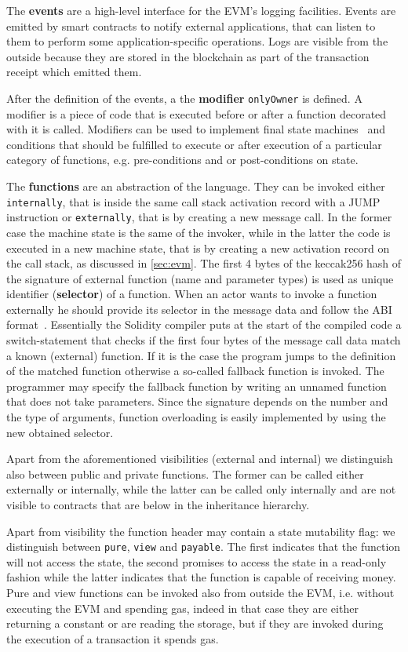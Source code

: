 The \textbf{events} are a high-level interface for the EVM's logging 
facilities. Events are emitted by smart contracts to notify external 
applications, that can listen to them to perform some application-specific
operations. Logs are visible from the outside because they are stored
in the blockchain as part of the transaction receipt which emitted them.

After the definition of the events, a the \textbf{modifier} \verb|onlyOwner| is
defined. A modifier is a piece of code that is executed before or after a 
function decorated with it is called. Modifiers can be used to implement final
state machines~\cite{bib:solidity-docs} and conditions that should be fulfilled 
to execute or after execution of a particular category of functions, e.g. 
pre-conditions and or post-conditions on state.

The \textbf{functions} are an abstraction of the language. They can be invoked 
either  \texttt{internally}, that is inside the same call stack activation 
record with a JUMP instruction or \texttt{externally}, that is by creating a
new message  call. In the former case the machine state is the same of the
invoker, while in the latter the code is executed in a new machine state, that is by creating a new activation record on the call stack, as discussed in
\autoref{sec:evm}.
The first 4 bytes of the keccak256 hash of the signature of external function
(name and parameter types) is used as unique identifier (\textbf{selector}) of
a function. When an actor wants to invoke a function externally he should 
provide its selector in the message data and follow the ABI
format~\cite{bib:solidity-docs}.
Essentially the Solidity compiler puts at the start of the compiled code a
switch-statement that checks if the first four bytes of the message call data
match a known (external) function. If it is the case the program jumps to the
definition of the matched function otherwise a so-called fallback function is 
invoked.
The programmer may specify the fallback function by writing an unnamed function
that does not take parameters. Since the signature depends on the number and
the type of arguments, function overloading is easily implemented by using
the new obtained selector.

Apart from the aforementioned visibilities (external and internal)
we distinguish also between public and private functions. The former can be
called either externally or internally, while the latter can be called only 
internally and are not visible to contracts that are below in the inheritance
hierarchy.

Apart from visibility the function header may contain a state mutability flag:
we distinguish between \texttt{pure}, \texttt{view} and \texttt{payable}. 
The first indicates that the function will not access the state, the second
promises to access the state in a read-only fashion while the latter indicates 
that the function is capable of receiving money.
Pure and view functions can be invoked also from outside the EVM, i.e. without
executing the EVM and spending gas, indeed in that case they are either
returning a constant or are reading the storage, but if they are invoked during
the execution of a transaction it spends gas.




